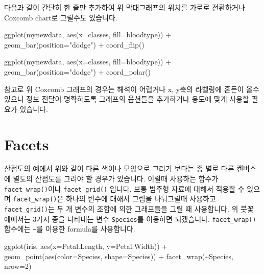 \documentclass[
]{book}
\newenvironment{Shaded}{\begin{snugshade}}{\end{snugshade}}
\newcommand{\AttributeTok}[1]{\textcolor[rgb]{0.77,0.63,0.00}{#1}}
\newcommand{\DecValTok}[1]{\textcolor[rgb]{0.00,0.00,0.81}{#1}}
\newcommand{\FunctionTok}[1]{\textcolor[rgb]{0.00,0.00,0.00}{#1}}
\newcommand{\NormalTok}[1]{#1}
\newcommand{\SpecialCharTok}[1]{\textcolor[rgb]{0.00,0.00,0.00}{#1}}
\newcommand{\StringTok}[1]{\textcolor[rgb]{0.31,0.60,0.02}{#1}}
\begin{document}
다음과 같이 간단히 한 줄만 추가하여 위 막대그래프의 위치를 가로로 전환하거나 Coxcomb chart로 그릴수도 있습니다.

\begin{Shaded}
\begin{Highlighting}[]
\FunctionTok{ggplot}\NormalTok{(mynewdata, }\FunctionTok{aes}\NormalTok{(}\AttributeTok{x=}\NormalTok{classes, }\AttributeTok{fill=}\NormalTok{bloodtype)) }\SpecialCharTok{+}
  \FunctionTok{geom\_bar}\NormalTok{(}\AttributeTok{position=}\StringTok{"dodge"}\NormalTok{) }\SpecialCharTok{+}
  \FunctionTok{coord\_flip}\NormalTok{()}
\end{Highlighting}
\end{Shaded}

\begin{Shaded}
\begin{Highlighting}[]
\FunctionTok{ggplot}\NormalTok{(mynewdata, }\FunctionTok{aes}\NormalTok{(}\AttributeTok{x=}\NormalTok{classes, }\AttributeTok{fill=}\NormalTok{bloodtype)) }\SpecialCharTok{+}
  \FunctionTok{geom\_bar}\NormalTok{(}\AttributeTok{position=}\StringTok{"dodge"}\NormalTok{) }\SpecialCharTok{+}
  \FunctionTok{coord\_polar}\NormalTok{()}
\end{Highlighting}
\end{Shaded}

참고로 위 Coxcomb 그래프의 경우는 해석이 어렵거나 x, y축의 라벨링에 혼돈이 올수 있으니 정보 전달이 명확하도록 그래프의 옵션들을 추가하거나 용도에 맞게 사용할 필요가 있습니다.

\hypertarget{facets}{%
\section{Facets}\label{facets}}

산점도의 예에서 위와 같이 다른 색이나 모양으로 그리기 보다는 종 별로 다른 켄버스에 별도의 산점도를 그려야 할 경우가 있습니다. 이럴때 사용하는 함수가 \texttt{facet\_wrap()}이나 \texttt{facet\_grid()} 입니다. 보통 범주형 자료에 대해서 적용할 수 있으며 \texttt{facet\_wrap()}은 하나의 변수에 대해서 그림을 나눠그릴때 사용하고 \texttt{facet\_grid()}는 두 개 변수의 조합에 의한 그래프들을 그릴 때 사용합니다. 위 붓꽃 예에서는 3가지 종을 나타내는 변수 \texttt{Species}를 이용하면 되겠습니다. \texttt{facet\_wrap()}함수에는 \texttt{\textasciitilde{}}를 이용한 formula를 사용합니다.

\begin{Shaded}
\begin{Highlighting}[]
\FunctionTok{ggplot}\NormalTok{(iris, }\FunctionTok{aes}\NormalTok{(}\AttributeTok{x=}\NormalTok{Petal.Length, }\AttributeTok{y=}\NormalTok{Petal.Width)) }\SpecialCharTok{+} 
  \FunctionTok{geom\_point}\NormalTok{(}\FunctionTok{aes}\NormalTok{(}\AttributeTok{color=}\NormalTok{Species, }\AttributeTok{shape=}\NormalTok{Species)) }\SpecialCharTok{+}
  \FunctionTok{facet\_wrap}\NormalTok{(}\SpecialCharTok{\textasciitilde{}}\NormalTok{Species, }\AttributeTok{nrow=}\DecValTok{2}\NormalTok{)}
\end{Highlighting}
\end{Shaded}
\end{document}
